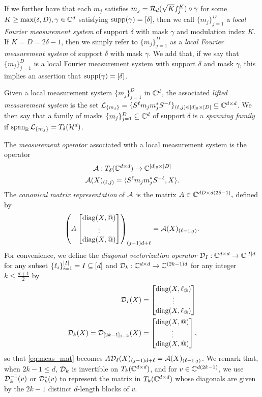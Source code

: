If we further have that each $m_j$ satisfies $m_j = \mathcal{R}_d(\sqrt{K} f_j^K) \circ \gamma$ for some $K \ge \max(\delta, D), \gamma \in \mathbb{C}^d$ satisfying $\operatorname{supp}(\gamma) = [\delta]$, then we call $\{m_j\}_{j = 1}^D$ a \emph{local Fourier measurement system} of support $\delta$ with mask $\gamma$ and modulation index $K$.  If $K = D = 2 \delta - 1$, then we simply refer to $\{m_j\}_{j = 1}^D$ as a \emph{local Fourier measurement system} of support $\delta$ with mask $\gamma$.  We add that, if we say that $\{m_j\}_{j = 1}^D$ is a local Fourier measurement system with support $\delta$ and mask $\gamma$, this implies an assertion that $\operatorname{supp}(\gamma) = [\delta]$.

Given a local measurement system $\{m_j\}_{j = 1}^D$ in $\mathbb{C}^d$, the associated \emph{lifted measurement system} is the set $\mathcal{L}_{\{m_j\}} = \{S^{\ell} m_j m_j^* S^{- \ell}\}_{(\ell, j) \in [d]_0 \times [D]} \subseteq \mathbb{C}^{d \times d}$.  We then say that a family of masks $\{m_j\}_{j = 1}^D \subseteq \mathbb{C}^d$ of support $\delta$ is a \emph{spanning family} if $\operatorname{span}_{\mathbb{R}} \mathcal{L}_{\{m_j\}} = T_\delta(\mathcal{H}^d)$.

The \emph{measurement operator} associated with a local measurement system is the operator
  \begin{gather}
    \mathcal{A} : T_\delta(\mathbb{C}^{d \times d}) \to \mathbb{C}^{[d]_0 \times [D]} \nonumber \\
    \mathcal{A}(X)_{(\ell, j)} = \langle S^{\ell} m_j m_j^* S^{-\ell}, X \rangle. \label{eq:meas_op}
  \end{gather}
  The \emph{canonical matrix representation} of $\mathcal{A}$ is the matrix $A \in \mathbb{C}^{d D \times d (2 \delta - 1)},$ defined by
  \begin{equation}
    \left(A \colmatfun{\diag(X, @)}{1 - \delta}{\delta - 1}\right)_{(j - 1) d + \ell} = \Ac(X)_{(\ell - 1, j)}.
    \label{eq:meas_mat}
  \end{equation}
  For convenience, we define the \emph{diagonal vectorization operator} $\mathcal{D}_I : \mathbb{C}^{d \times d} \to \mathbb{C}^{\lvert I\rvert d}$ for any subset $\{\ell_i\}_{i = 1}^{\lvert I\rvert} = I \subseteq [d]$ and $\mathcal{D}_k : \mathbb{C}^{d \times d} \to \mathbb{C}^{(2 k - 1) d}$ for any integer $k \le \frac{d + 1}{2}$ by
  \begin{align}
    \Dc_I(X) &= \colmatfun{\diag(X, \ell_@)}{1}{\abs{I}}
    \label{eq:diag_vec_set} \\
    \Dc_k(X) = \Dc_{[2 k - 1]_{1 - k}}(X) &= \colmatfun{\diag(X, @)}{1 - k}{k - 1},
    \label{eq:diag_vec}
  \end{align}
  so that \eqref{eq:meas_mat} becomes $A \mathcal{D}_{\delta} (X)_{(j - 1) d + \ell} = \mathcal{A}(X)_{(\ell - 1, j)}$.  We remark that, when $2 k - 1 \le d$, $\mathcal{D}_k$ is invertible on $T_k(\mathbb{C}^{d \times d})$, and for $v \in \mathbb{C}^{d (2 k - 1)}$, we use $\mathcal{D}_k^{-1}(v)$ or $\mathcal{D}_k^*(v)$ to represent the matrix in $T_k(\mathbb{C}^{d \times d})$ whose diagonals are given by the $2k - 1$ distinct $d$-length blocks of $v$.

